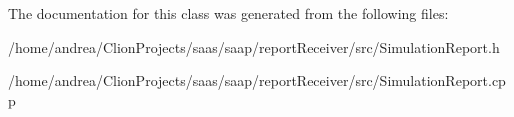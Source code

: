 The documentation for this class was generated from the following files\+:\begin{DoxyCompactItemize}
\item 
/home/andrea/\+Clion\+Projects/saas/saap/report\+Receiver/src/Simulation\+Report.\+h\item 
/home/andrea/\+Clion\+Projects/saas/saap/report\+Receiver/src/Simulation\+Report.\+cpp\end{DoxyCompactItemize}
